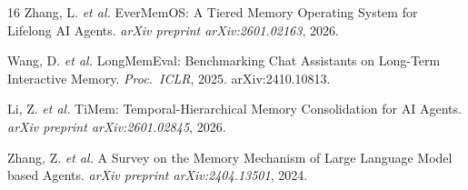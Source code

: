 \documentclass[11pt,a4paper,twocolumn]{article}
\begin{document}
\begin{thebibliography}{16}
Zhang, L. \textit{et al.}
\newblock EverMemOS: A Tiered Memory Operating System for Lifelong AI Agents.
\newblock \textit{arXiv preprint arXiv:2601.02163}, 2026.

Wang, D. \textit{et al.}
\newblock LongMemEval: Benchmarking Chat Assistants on Long-Term Interactive
  Memory.
\newblock \textit{Proc.\ ICLR}, 2025. arXiv:2410.10813.

Li, Z. \textit{et al.}
\newblock TiMem: Temporal-Hierarchical Memory Consolidation for AI Agents.
\newblock \textit{arXiv preprint arXiv:2601.02845}, 2026.

Zhang, Z. \textit{et al.}
\newblock A Survey on the Memory Mechanism of Large Language Model based Agents.
\newblock \textit{arXiv preprint arXiv:2404.13501}, 2024.

\end{thebibliography}
\end{document}
